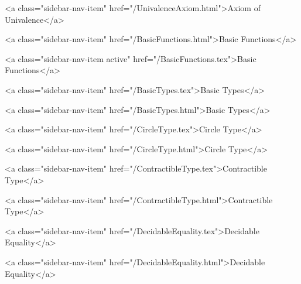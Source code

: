           <a class="sidebar-nav-item" href="/UnivalenceAxiom.html">Axiom of Univalence</a>
        
      
    
      
        
          <a class="sidebar-nav-item" href="/BasicFunctions.html">Basic Functions</a>
        
      
    
      
        
          <a class="sidebar-nav-item active" href="/BasicFunctions.tex">Basic Functions</a>
        
      
    
      
        
          <a class="sidebar-nav-item" href="/BasicTypes.tex">Basic Types</a>
        
      
    
      
        
          <a class="sidebar-nav-item" href="/BasicTypes.html">Basic Types</a>
        
      
    
      
        
          <a class="sidebar-nav-item" href="/CircleType.tex">Circle Type</a>
        
      
    
      
        
          <a class="sidebar-nav-item" href="/CircleType.html">Circle Type</a>
        
      
    
      
        
          <a class="sidebar-nav-item" href="/ContractibleType.tex">Contractible Type</a>
        
      
    
      
        
          <a class="sidebar-nav-item" href="/ContractibleType.html">Contractible Type</a>
        
      
    
      
        
          <a class="sidebar-nav-item" href="/DecidableEquality.tex">Decidable Equality</a>
        
      
    
      
        
          <a class="sidebar-nav-item" href="/DecidableEquality.html">Decidable Equality</a>
        
      
    
